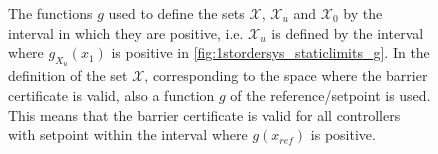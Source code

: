 \begin{figure}[htbp]
	\hspace*{-5mm}
	\hspace{-2mm}
	\caption{The functions $g$ used to define the sets $\mathcal{X}$, $\mathcal{X}_u$ and $\mathcal{X}_0$ by the interval in which they are positive, i.e. $\mathcal{X}_u$ is defined by the interval where $g_{X_u}(x_1)$ is positive in \autoref{fig:1stordersys_staticlimits_g}. In the definition of the set $\mathcal{X}$, corresponding to the space where the barrier certificate is valid, also a function $g$ of the reference/setpoint is used. This means that the barrier certificate is valid for all controllers with setpoint within the interval where $g(x_{ref})$ is positive.}
	\label{fig:1D_static_gfunctions}
\end{figure}

